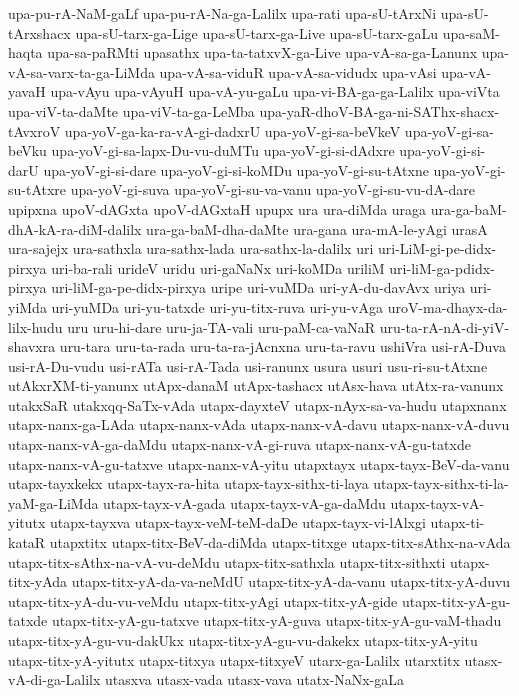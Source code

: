 {upa-pu-rA-NaM-gaLf
upa-pu-rA-Na-ga-Lalilx
upa-rati
upa-sU-tArxNi
upa-sU-tArxshacx
upa-sU-tarx-ga-Lige
upa-sU-tarx-ga-Live
upa-sU-tarx-gaLu
upa-saM-haqta
upa-sa-paRMti
upasathx
upa-ta-tatxvX-ga-Live
upa-vA-sa-ga-Lanunx
upa-vA-sa-varx-ta-ga-LiMda
upa-vA-sa-viduR
upa-vA-sa-vidudx
upa-vAsi
upa-vA-yavaH
upa-vAyu
upa-vAyuH
upa-vA-yu-gaLu
upa-vi-BA-ga-ga-Lalilx
upa-viVta
upa-viV-ta-daMte
upa-viV-ta-ga-LeMba
upa-yaR-dhoV-BA-ga-ni-SAThx-shacx-tAvxroV
upa-yoV-ga-ka-ra-vA-gi-dadxrU
upa-yoV-gi-sa-beVkeV
upa-yoV-gi-sa-beVku
upa-yoV-gi-sa-lapx-Du-vu-duMTu
upa-yoV-gi-si-dAdxre
upa-yoV-gi-si-darU
upa-yoV-gi-si-dare
upa-yoV-gi-si-koMDu
upa-yoV-gi-su-tAtxne
upa-yoV-gi-su-tAtxre
upa-yoV-gi-suva
upa-yoV-gi-su-va-vanu
upa-yoV-gi-su-vu-dA-dare
upipxna
upoV-dAGxta
upoV-dAGxtaH
upupx
ura
ura-diMda
uraga
ura-ga-baM-dhA-kA-ra-diM-dalilx
ura-ga-baM-dha-daMte
ura-gana
ura-mA-le-yAgi
urasA
ura-sajejx
ura-sathxla
ura-sathx-lada
ura-sathx-la-dalilx
uri
uri-LiM-gi-pe-didx-pirxya
uri-ba-rali
urideV
uridu
uri-gaNaNx
uri-koMDa
uriliM
uri-liM-ga-pdidx-pirxya
uri-liM-ga-pe-didx-pirxya
uripe
uri-vuMDa
uri-yA-du-davAvx
uriya
uri-yiMda
uri-yuMDa
uri-yu-tatxde
uri-yu-titx-ruva
uri-yu-vAga
uroV-ma-dhayx-da-lilx-hudu
uru
uru-hi-dare
uru-ja-TA-vali
uru-paM-ca-vaNaR
uru-ta-rA-nA-di-yiV-shavxra
uru-tara
uru-ta-rada
uru-ta-ra-jAcnxna
uru-ta-ravu
ushiVra
usi-rA-Duva
usi-rA-Du-vudu
usi-rATa
usi-rA-Tada
usi-ranunx
usura
usuri
usu-ri-su-tAtxne
utAkxrXM-ti-yanunx
utApx-danaM
utApx-tashacx
utAsx-hava
utAtx-ra-vanunx
utakxSaR
utakxqq-SaTx-vAda
utapx-dayxteV
utapx-nAyx-sa-va-hudu
utapxnanx
utapx-nanx-ga-LAda
utapx-nanx-vAda
utapx-nanx-vA-davu
utapx-nanx-vA-duvu
utapx-nanx-vA-ga-daMdu
utapx-nanx-vA-gi-ruva
utapx-nanx-vA-gu-tatxde
utapx-nanx-vA-gu-tatxve
utapx-nanx-vA-yitu
utapxtayx
utapx-tayx-BeV-da-vanu
utapx-tayxkekx
utapx-tayx-ra-hita
utapx-tayx-sithx-ti-laya
utapx-tayx-sithx-ti-la-yaM-ga-LiMda
utapx-tayx-vA-gada
utapx-tayx-vA-ga-daMdu
utapx-tayx-vA-yitutx
utapx-tayxva
utapx-tayx-veM-teM-daDe
utapx-tayx-vi-lAlxgi
utapx-ti-kataR
utapxtitx
utapx-titx-BeV-da-diMda
utapx-titxge
utapx-titx-sAthx-na-vAda
utapx-titx-sAthx-na-vA-vu-deMdu
utapx-titx-sathxla
utapx-titx-sithxti
utapx-titx-yAda
utapx-titx-yA-da-va-neMdU
utapx-titx-yA-da-vanu
utapx-titx-yA-duvu
utapx-titx-yA-du-vu-veMdu
utapx-titx-yAgi
utapx-titx-yA-gide
utapx-titx-yA-gu-tatxde
utapx-titx-yA-gu-tatxve
utapx-titx-yA-guva
utapx-titx-yA-gu-vaM-thadu
utapx-titx-yA-gu-vu-dakUkx
utapx-titx-yA-gu-vu-dakekx
utapx-titx-yA-yitu
utapx-titx-yA-yitutx
utapx-titxya
utapx-titxyeV
utarx-ga-Lalilx
utarxtitx
utasx-vA-di-ga-Lalilx
utasxva
utasx-vada
utasx-vava
utatx-NaNx-gaLa
}
